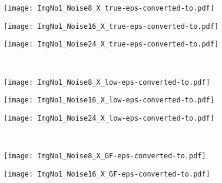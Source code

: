 \documentclass{article}
\begin{document}
\begin{figure*}[th]
	\begin{multicols}{2}  
		\centering
		\begin{minipage}[b]{0.1\linewidth}
		\end{minipage} 
		\begin{minipage}[b]{0.28\linewidth}
			\centering
			\texttt{[image: ImgNo1\_Noise8\_X\_true-eps-converted-to.pdf]}
		\end{minipage} 
		\begin{minipage}[b]{0.28\linewidth}
			\centering
			\texttt{[image: ImgNo1\_Noise16\_X\_true-eps-converted-to.pdf]}
		\end{minipage} 
		\begin{minipage}[b]{0.28\linewidth}
			\centering
			\texttt{[image: ImgNo1\_Noise24\_X\_true-eps-converted-to.pdf]}
		\end{minipage} 
		\\
		\begin{minipage}[b]{0.1\linewidth}
		\end{minipage} 
		\begin{minipage}[b]{0.28\linewidth}
			\centering
			\texttt{[image: ImgNo1\_Noise8\_X\_low-eps-converted-to.pdf]}
		\end{minipage} 
		\begin{minipage}[b]{0.28\linewidth}
			\centering
			\texttt{[image: ImgNo1\_Noise16\_X\_low-eps-converted-to.pdf]}
		\end{minipage} 
		\begin{minipage}[b]{0.28\linewidth}
			\centering
			\texttt{[image: ImgNo1\_Noise24\_X\_low-eps-converted-to.pdf]}
		\end{minipage} 
		\\
		\begin{minipage}[b]{0.1\linewidth}
		\end{minipage}  
		\begin{minipage}[b]{0.28\linewidth}
			\centering
			\texttt{[image: ImgNo1\_Noise8\_X\_GF-eps-converted-to.pdf]}
		\end{minipage} 
		\begin{minipage}[b]{0.28\linewidth}
			\centering
			\texttt{[image: ImgNo1\_Noise16\_X\_GF-eps-converted-to.pdf]}

\end{minipage}
\end{multicols}
\end{figure*}
\end{document}
